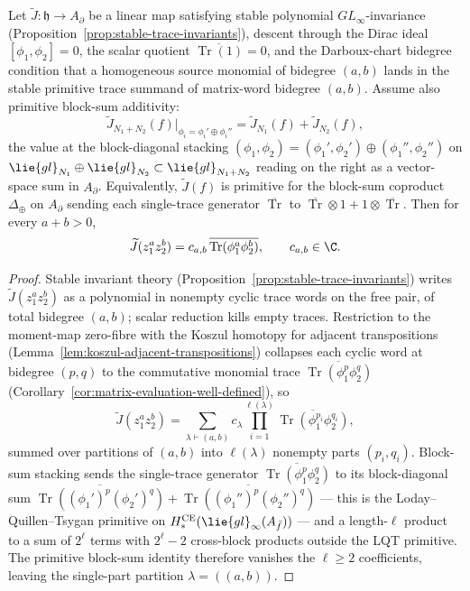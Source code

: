 \documentclass[11pt]{memoir}
\begin{document}
\begin{lem}\label{lem:natural-correction-obstruction}
  Let \(\widetilde J\colon\mathfrak h\to A_\partial\) be a linear map
  satisfying stable polynomial \(GL_\infty\)-invariance
  (Proposition~\ref{prop:stable-trace-invariants}), descent through
  the Dirac ideal \([\phi_1,\phi_2]=0\), the scalar quotient
  \(\overline{\operatorname{Tr}(1)}=0\), and the Darboux-chart
  bidegree condition that a homogeneous source monomial of bidegree
  \((a,b)\) lands in the stable primitive trace summand of matrix-word
  bidegree \((a,b)\).  Assume also primitive block-sum additivity:
  \[
    \widetilde J_{N_1+N_2}(f)\big|_{\phi_i=\phi_i'\oplus\phi_i''}
     =\widetilde J_{N_1}(f)
       +\widetilde J_{N_2}(f),
  \]
  the value at the block-diagonal stacking
  \((\phi_1,\phi_2)=(\phi_1',\phi_2')\oplus(\phi_1'',\phi_2'')\) on
  \(\lie{gl}_{N_1}\oplus\lie{gl}_{N_2}\subset\lie{gl}_{N_1+N_2}\)
  reading on the right as a vector-space sum in \(A_\partial\).
  Equivalently, \(\widetilde J(f)\) is primitive for the block-sum
  coproduct \(\Delta_\oplus\) on \(A_\partial\) sending each
  single-trace generator
  \(\overline{\operatorname{Tr}}\) to
  \(\overline{\operatorname{Tr}}\otimes 1+1\otimes
   \overline{\operatorname{Tr}}\).  Then for every \(a+b>0\),
  \[
    \widetilde J(z_1^az_2^b)
     =c_{a,b}\,\overline{\operatorname{Tr}(\phi_1^a\phi_2^b)},
    \qquad c_{a,b}\in\C.
  \]
\end{lem}

\begin{proof}
  Stable invariant theory
  (Proposition~\ref{prop:stable-trace-invariants}) writes
  \(\widetilde J(z_1^az_2^b)\) as a polynomial in nonempty cyclic
  trace words on the free pair, of total bidegree \((a,b)\); scalar
  reduction kills empty traces.  Restriction to the moment-map
  zero-fibre with the Koszul homotopy for adjacent transpositions
  (Lemma~\ref{lem:koszul-adjacent-transpositions}) collapses each cyclic word at
  bidegree \((p,q)\) to the commutative monomial trace
  \(\overline{\operatorname{Tr}(\phi_1^p\phi_2^q)}\)
  (Corollary~\ref{cor:matrix-evaluation-well-defined}), so
  \[
    \widetilde J(z_1^az_2^b)
     =\sum_{\lambda\vdash(a,b)}
       c_\lambda
       \prod_{i=1}^{\ell(\lambda)}
        \overline{\operatorname{Tr}(\phi_1^{p_i}\phi_2^{q_i})},
  \]
  summed over partitions of \((a,b)\) into \(\ell(\lambda)\)
  nonempty parts \((p_i,q_i)\).
  Block-sum stacking sends the single-trace generator
  \(\overline{\operatorname{Tr}(\phi_1^p\phi_2^q)}\) to its
  block-diagonal sum
  \(\overline{\operatorname{Tr}((\phi_1')^p(\phi_2')^q)}
   +\overline{\operatorname{Tr}((\phi_1'')^p(\phi_2'')^q)}\)
  --- this is the Loday--Quillen--Tsygan primitive on
  \(H^{\mathrm{CE}}_*(\lie{gl}_\infty(A_{\bar f}))\) --- and a
  length-\(\ell\) product to a sum of \(2^\ell\) terms with
  \(2^\ell-2\) cross-block products outside the LQT primitive.  The
  primitive block-sum identity therefore vanishes the
  \(\ell\ge2\) coefficients, leaving the single-part partition
  \(\lambda=((a,b))\).
\end{proof}
\end{document}
